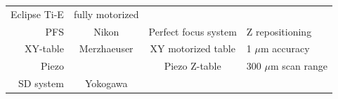 \documentclass[11pt,singlespacinge,twoside]{reedthesis} %
\begin{document}
\begin{longtable}[]{@{}rccl@{}}
\begin{minipage}[t]{0.23\columnwidth}
Eclipse Ti-E\strut
\end{minipage} & \begin{minipage}[t]{0.30\columnwidth}\raggedright
fully motorized\strut
\end{minipage}\tabularnewline
\begin{minipage}[t]{0.20\columnwidth}\raggedleft
PFS\strut
\end{minipage} & \begin{minipage}[t]{0.16\columnwidth}\centering
Nikon\strut
\end{minipage} & \begin{minipage}[t]{0.23\columnwidth}\centering
Perfect focus system\strut
\end{minipage} & \begin{minipage}[t]{0.30\columnwidth}\raggedright
Z repositioning\strut
\end{minipage}\tabularnewline
\begin{minipage}[t]{0.20\columnwidth}\raggedleft
XY-table\strut
\end{minipage} & \begin{minipage}[t]{0.16\columnwidth}\centering
Merzhaeuser\strut
\end{minipage} & \begin{minipage}[t]{0.23\columnwidth}\centering
XY motorized table\strut
\end{minipage} & \begin{minipage}[t]{0.30\columnwidth}\raggedright
1 \(\mu\)m accuracy\strut
\end{minipage}\tabularnewline
\begin{minipage}[t]{0.20\columnwidth}\raggedleft
Piezo\strut
\end{minipage} & \begin{minipage}[t]{0.16\columnwidth}\centering
\strut
\end{minipage} & \begin{minipage}[t]{0.23\columnwidth}\centering
Piezo Z-table\strut
\end{minipage} & \begin{minipage}[t]{0.30\columnwidth}\raggedright
300 \(\mu\)m scan range\strut
\end{minipage}\tabularnewline
\begin{minipage}[t]{0.20\columnwidth}\raggedleft
SD system\strut
\end{minipage} & \begin{minipage}[t]{0.16\columnwidth}\centering
Yokogawa\strut
\end{minipage} & \begin{minipage}[t]{0.23\columnwidth}\centering

\end{minipage}
\end{longtable}
\end{document}
